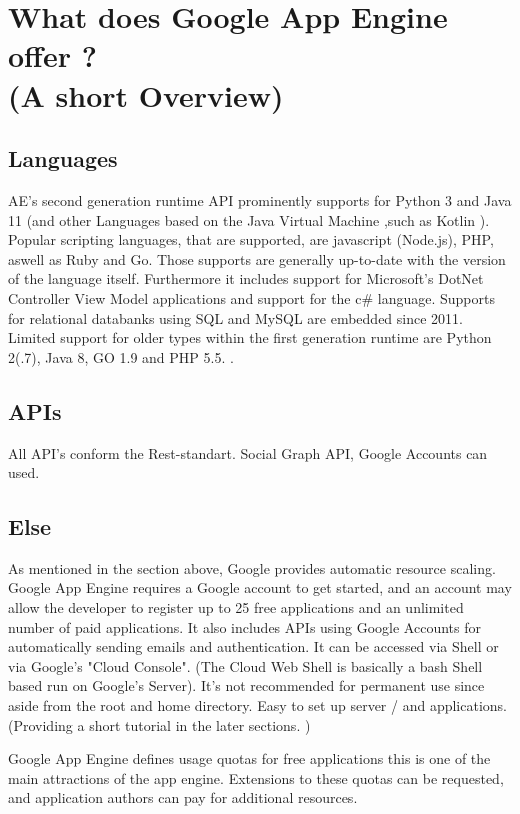 \documentclass{article}
\begin{document}
\section{What does Google App Engine  offer ?\\ (A short Overview) }
\subsection*{Languages}
AE's second generation runtime API prominently supports for Python 3 and Java 11 (and other Languages based on the Java Virtual Machine ,such as Kotlin ).
Popular scripting languages, that are supported, are javascript (Node.js), PHP, aswell as Ruby and Go.
Those supports are generally up-to-date with the version of the language itself. 
Furthermore it includes support for Microsoft's DotNet Controller View Model applications and support for the c\# language.
Supports for relational databanks using SQL and MySQL are embedded since 2011. 
Limited support for older types within the first generation runtime are Python 2(.7), Java 8, GO 1.9 and PHP 5.5. .
\subsection*{APIs}
All API's conform the Rest-standart. Social Graph API, Google Accounts can used.
\subsection*{Else}
As mentioned in the section above, Google provides automatic resource scaling.
Google App Engine requires a Google account to get started, and an account may allow the developer to register up to 25 free applications and an unlimited number of paid applications.
It also includes APIs using Google Accounts for automatically sending emails and authentication.
It can be accessed via Shell or via Google's "Cloud Console". (The Cloud Web Shell is basically a bash Shell based run on Google's Server). It's not recommended for permanent use since aside from the root and home directory. 
Easy to set up server / and applications. (Providing a short tutorial in the later sections. )




Google App Engine defines usage quotas for free applications this is one of the main attractions of the app engine. Extensions to these quotas can be requested, and application authors can pay for additional resources.
\end{document}
